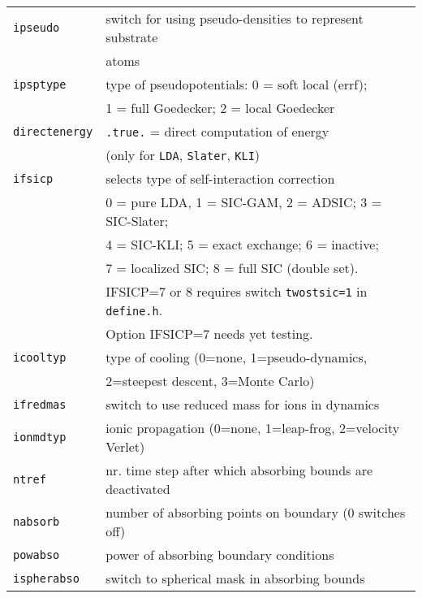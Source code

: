 \documentclass[12pt]{article}
\begin{document}
\begin{tabular}{ll}
{\tt ipseudo          }& switch for using pseudo-densities to represent substrate\\
{\tt                  }& atoms \\
{\tt ipsptype         }& type of pseudopotentials: 0 = soft local (errf);\\
                       & 1 = full Goedecker; 2 = local Goedecker\\
{\tt directenergy}   & {\tt .true.} = direct computation of energy \\
                       & (only for {\tt LDA}, {\tt Slater}, {\tt KLI})\\
{\tt ifsicp           }& selects type of self-interaction correction\\
    &  0 = pure LDA, 1 = SIC-GAM, 2 = ADSIC; 3 = SIC-Slater; \\
    &  4 = SIC-KLI; 5 = exact exchange; 6 = inactive;\\
    &  7 = localized SIC;  8 = full SIC (double set).\\
    & IFSICP=7 or 8 requires switch
     {\tt twostsic=1} in {\tt define.h}.\\
    & Option IFSICP=7 needs yet testing.\\
{\tt icooltyp         }& type of cooling (0=none, 1=pseudo-dynamics,\\
{\tt                  }& 2=steepest descent, 3=Monte Carlo)\\
{\tt ifredmas         }& switch to use reduced mass for ions in dynamics\\
{\tt ionmdtyp         }& ionic propagation
                         (0=none, 1=leap-frog, 2=velocity Verlet)\\
{\tt ntref}& nr. time step after which absorbing bounds are deactivated
\\
{\tt nabsorb}          & number of absorbing points on boundary (0 switches off) 
\\
{\tt powabso}          & power of absorbing boundary conditions
\\
{\tt ispherabso}       & switch to spherical mask in absorbing bounds
\\
\hline
\end{tabular}
\end{document}
